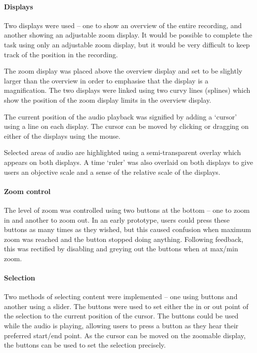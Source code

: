 \paragraph{Displays}
Two displays were used -- one to show an overview of the entire recording, and another showing an adjustable zoom
display. It would be possible to complete the task using only an adjustable zoom display, but it would be very
difficult to keep track of the position in the recording.

The zoom display was placed above the overview display and set to be slightly larger than the overview in order to
emphasise that the display is a magnification. The two displays were linked using two curvy lines (splines) which show
the position of the zoom display limits in the overview display.

The current position of the audio playback was signified by adding a `cursor' using a line on each display. The cursor
can be moved by clicking or dragging on either of the displays using the mouse.

Selected areas of audio are highlighted using a semi-transparent overlay which appears on both displays.  A time
`ruler' was also overlaid on both displays to give users an objective scale and a sense of the relative scale of the
displays.

\paragraph{Zoom control}
The level of zoom was controlled using two buttons at the bottom -- one to zoom in and another to zoom out. In an early
prototype, users could press these buttons as many times as they wished, but this caused confusion when maximum zoom
was reached and the button stopped doing anything. Following feedback, this was rectified by disabling and greying out
the buttons when at max/min zoom.

\paragraph{Selection}
Two methods of selecting content were implemented -- one using buttons and another using a slider. The buttons were
used to set either the in or out point of the selection to the current position of the cursor. The buttons could be
used while the audio is playing, allowing users to press a button as they hear their preferred start/end point. As the
cursor can be moved on the zoomable display, the buttons can be used to set the selection precisely.

